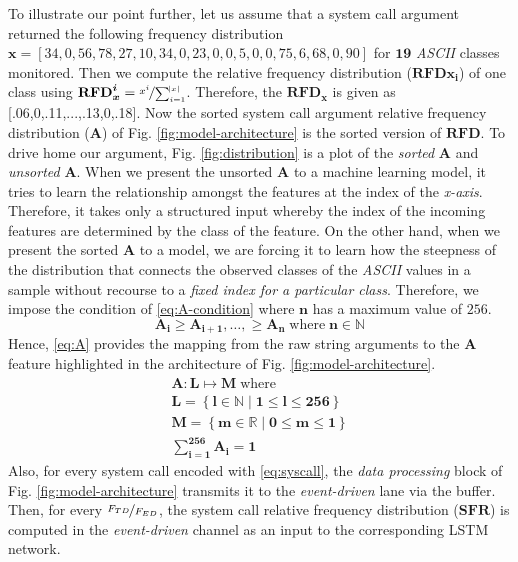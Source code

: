 To illustrate our point further, let us assume that a system call argument 
returned the following frequency distribution $ \mathbf{x} = 
\left[34,0,56,78,27,10,34,0,23,0,0,5,0,0,75,6,68,0,90\right] $ for $ 
\mathbf{19} $ \textit{ASCII} classes monitored. Then we compute the relative 
frequency distribution ($ \bm{\mathbf{RFD}x_i} $) of one class using $ 
\bm{\mathbf{RFD}_x^i} = \nicefrac{x^i}{\sum_{i=1}^{\abs{x}}} $. Therefore, the 
$ 
\bm{\mathbf{RFD}_x} $ is given as 
[.06,0,.11,...,.13,0,.18]. Now the sorted 
system call argument relative frequency distribution ($ \bm{\mathbf{A}} $) 
of Fig. 
\ref{fig:model-architecture} is the sorted version of $ \bm{\mathbf{RFD}} $. To 
drive home our argument, Fig. \ref{fig:distribution} is a plot of the 
\emph{sorted} $\bm{\mathbf{A}} $ and \emph{unsorted} $\bm{\mathbf{A}} 
$. When we present the unsorted $\bm{\mathbf{A}} $ to a machine learning 
model, it tries to learn the relationship amongst the features at the index of 
the \emph{x-axis}. Therefore, it takes only a structured input whereby the 
index of the incoming features are determined by the class of the feature. On 
the other 
hand, when we present the sorted $\bm{\mathbf{A}} $ to a model, we are 
forcing it to learn how the steepness of the distribution that connects the 
observed classes of the \textit{ASCII} values in a sample without recourse to a 
\emph{fixed index for a particular class}. Therefore, we impose the condition 
of \eqref{eq:A-condition} where $ \bm{\mathbf{n}} $ has a maximum value of 
$ 256 $.
\begin{equation}
\bm{\mathbf{A_{i}}} \geq \bm{\mathbf{A_{i+1}}},\ldots, \geq 
\bm{\mathbf{A_n}} \; 
\text{where}\; \bm{\mathbf{n}} \in \bm{\mathbb{N}}
\label{eq:A-condition}
\end{equation}
Hence, \eqref{eq:A} provides the mapping from the raw string arguments to 
the 
$ \bm{\mathbf{A}} $ feature highlighted in the architecture of Fig. 
\ref{fig:model-architecture}.
\begin{align}
\bm{\mathbf{A}}: \bm{\mathbf{L}} \longmapsto \bm{\mathbf{M}} \; 
\text{where} \label{eq:A} \\
\bm{\mathbf{L}} = \left\lbrace \bm{l \in \mathbb{N} \mid 1 \leq l \leq 256} 
\right\rbrace \\
\bm{\mathbf{M}} = \left\lbrace \bm{m \in \mathbb{R} \mid 0 \leq m \leq 1} 
\right\rbrace \\
\bm{\sum_{i=1}^{256} \mathbf{A}_i = 1}
\end{align}
Also, for every system call encoded with \eqref{eq:syscall}, the 
\emph{data processing} block of Fig. \ref{fig:model-architecture} transmits it 
to the 
\emph{event-driven} lane via the buffer. Then, for every $ 
\nicefrac{F_{TD}}{F_{ED}} $, the system call relative frequency distribution ($ 
\bm{\mathbf{SFR}} $) is computed in the \emph{event-driven} channel as an input 
to the corresponding LSTM network.

